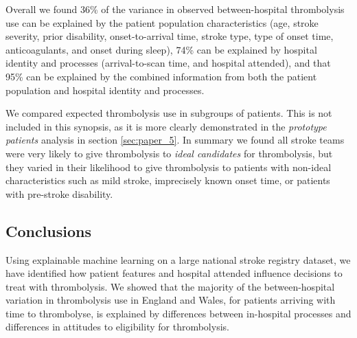 Overall we found 36\% of the variance in observed between-hospital thrombolysis use can be explained by the patient population characteristics (age, stroke severity, prior disability, onset-to-arrival time, stroke type, type of onset time, anticoagulants, and onset during sleep), 74\% can be explained by hospital identity and processes (arrival-to-scan time, and hospital attended), and that 95\% can be explained by the combined information from both the patient population and hospital identity and processes.

We compared expected thrombolysis use in subgroups of patients. This is not included in this synopsis, as it is more clearly demonstrated in the \textit{prototype patients} analysis in section \ref{sec:paper_5}. In summary we found all stroke teams were very likely to give thrombolysis to \textit{ideal candidates} for thrombolysis, but they varied in their likelihood to give thrombolysis to patients with non-ideal characteristics such as mild stroke, imprecisely known onset time, or patients with pre-stroke disability. 

\subsection{Conclusions}

Using explainable machine learning on a large national stroke registry dataset, we have identified how patient features and hospital attended influence decisions to treat with thrombolysis. We showed that the majority of the between-hospital variation in thrombolysis use in England and Wales, for patients arriving with time to thrombolyse, is explained by differences between in-hospital processes and differences in attitudes to eligibility for thrombolysis.